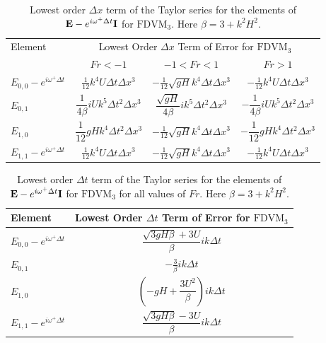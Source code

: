 \begin{table}
	\begin{tabular}{l c c c}
		\hline
		Element & \multicolumn{3}{c}{Lowest Order $\Delta x$ Term of Error for $\text{FDVM}_3$} \T \B \\
	 \cline{2-4} 
		& $Fr < -1$  & $-1 < Fr < 1$ & $Fr > 1$ \T \B \\
		\hline
		$E_{0,0} -  e^{i \omega^+ \Delta t} $& $\frac{1}{12} k^4 U \Delta t \Delta x^3$& $ - \frac{1}{12} \sqrt{gH} k^4 \Delta t\Delta x^3$ &  $ -\frac{1}{12} k^4 U \Delta t \Delta x^3$  \T \B  \\
		$E_{0,1}$& $\dfrac{1}{4 \beta}iUk^5 \Delta t^2 \Delta x^3 $  &$ \dfrac{\sqrt{gH}}{4 \beta}i k^5\Delta  t ^2\Delta x^3$ & $-\dfrac{1}{4 \beta}iUk^5 \Delta t^2 \Delta x^3 $  \T \B  \\
		$E_{1,0}$& $\dfrac{1}{12} gHk^4 \Delta t^2 \Delta x^3 $  &$ - \frac{1}{12} \sqrt{gH} k^4 \Delta t\Delta x^3$ & $-\dfrac{1}{12} gHk^4 \Delta t^2 \Delta x^3 $  \T \B \\
		$E_{1,1} -  e^{i \omega^+ \Delta t}$& $ \frac{1}{12} k^4 U \Delta t \Delta x^3$  &$ - \frac{1}{12} \sqrt{gH} k^4 \Delta t\Delta x^3$ & $ -\frac{1}{12} k^4 U \Delta t \Delta x^3$ \T \B  \\ 
		\hline
	\end{tabular}
	\caption{Lowest order $\Delta x$ term of the Taylor series for the elements of $\mathbf{E} - e^{i \omega^+ \Delta t} \mathbf{I}$ for $\text{FDVM}_3$. Here $\beta = 3 + k^2 H^2$.}
	\label{tab:EerrFDVM3dxerror} 
\end{table}
\begin{table}
	\begin{tabular}{l  c}
		\hline
		Element & \multicolumn{1}{c}{Lowest Order $\Delta t$ Term of Error for $\text{FDVM}_3$} \T \B \\
		\hline  
		$E_{0,0} -  e^{i \omega^+ \Delta t} $ & $\dfrac{\sqrt{3gH \beta} + 3U}{\beta} ik \Delta t$ \T \B  \\
		$E_{0,1}$&  $ - \frac{3}{\beta} ik\Delta t$ \T \B   \\
		$E_{1,0}$&   $ \left(-gH + \dfrac{3U^2}{\beta}\right)ik \Delta t$ \T \B  \\
		$E_{1,1} -  e^{i \omega^+ \Delta t}$& $\dfrac{\sqrt{3gH \beta} - 3U}{\beta} ik \Delta t$ \T \B \\ 
		\hline
	\end{tabular}
	\caption{Lowest order $\Delta t$ term of the Taylor series for the elements of $\mathbf{E} - e^{i \omega^+ \Delta t} \mathbf{I}$ for $\text{FDVM}_3$ for all values of $Fr$. Here $\beta = 3 + k^2 H^2$.}
	\label{tab:EerrFDVM3dterror} 
\end{table}
